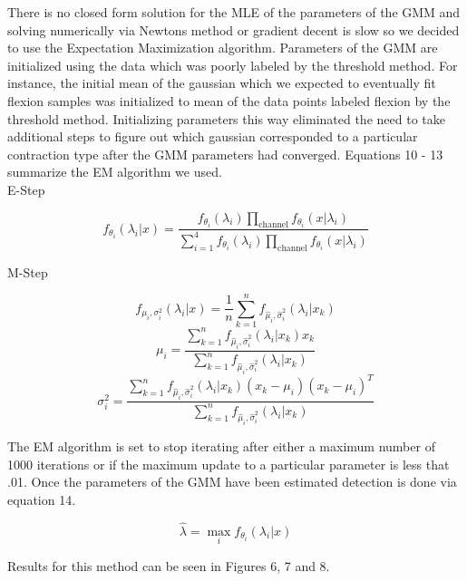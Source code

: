 \documentclass[times, 10pt,twocolumn]{article}
\begin{document}
There is no closed form solution for the MLE of the parameters of the GMM and solving numerically via
Newtons method or gradient decent is slow so we decided to use the Expectation Maximization algorithm. Parameters
of the GMM are initialized using the data which was poorly labeled by the threshold method. For instance,
the initial mean of the gaussian which we expected to eventually fit flexion samples was initialized to mean of the
data points labeled flexion by the threshold method. Initializing parameters this way eliminated the need to take
additional steps to figure out which gaussian corresponded to a particular contraction type after the GMM parameters
had converged. Equations 10 - 13 summarize the EM algorithm we used. \\

E-Step

\begin{equation}
f_{\theta_i}(\lambda_i|x) = \frac{f_{\theta_i}(\lambda_i)\prod_{\text{channel}}f_{\theta_i}(x|\lambda_i)}{\sum_{i=1}^{4}f_{\theta_i}(\lambda_i)\prod_{\text{channel}}f_{\theta_i}(x|\lambda_i)}
\end{equation}

M-Step

\begin{equation}
f_{\mu_i,\sigma_i^2}(\lambda_i|x) = \frac{1}{n}\sum_{k=1}^{n}f_{\hat{\mu}_i,\hat{\sigma}_i^2}(\lambda_i|x_k)
\end{equation}
\begin{equation}
\mu_i = \frac{\sum_{k=1}^{n}f_{\hat{\mu}_i,\hat{\sigma}_i^2}(\lambda_i|x_k)x_k}{\sum_{k=1}^{n}f_{\hat{\mu}_i,\hat{\sigma}_i^2}(\lambda_i|x_k)}
\end{equation}
\begin{equation}
\sigma_i^2 = \frac{\sum_{k=1}^{n}f_{\hat{\mu}_i,\hat{\sigma}_i^2}(\lambda_i|x_k)(x_k-\mu_i)(x_k-\mu_i)^T}{\sum_{k=1}^{n}f_{\hat{\mu}_i,\hat{\sigma}_i^2}(\lambda_i|x_k)}
\end{equation}

The EM algorithm is set to stop iterating after either a maximum number of 1000 iterations or if the maximum update to a particular parameter is less that .01.
Once the parameters of the GMM have been estimated detection is done via equation 14.

\begin{equation}
\hat{\lambda} = \max_{i}f_{\theta_i}(\lambda_i|x)
\end{equation}

Results for this method can be seen in Figures 6, 7 and 8.
\end{document}
